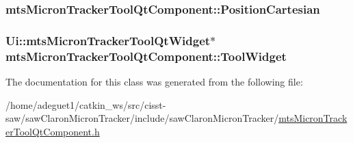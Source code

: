 \hypertarget{classmts_micron_tracker_tool_qt_component_a9ce46838a73866850a7a06a339b4d121}{
\subsubsection[{Position\-Cartesian}]{ mts\-Micron\-Tracker\-Tool\-Qt\-Component\-::\-Position\-Cartesian}}\label{classmts_micron_tracker_tool_qt_component_a9ce46838a73866850a7a06a339b4d121}
\hypertarget{classmts_micron_tracker_tool_qt_component_a78d45496b35b856b483e6600599dc4a4}{
\subsubsection[{Tool\-Widget}]{\setlength{\rightskip}{0pt plus 5cm}Ui\-::mts\-Micron\-Tracker\-Tool\-Qt\-Widget$\ast$ mts\-Micron\-Tracker\-Tool\-Qt\-Component\-::\-Tool\-Widget\hspace{0.3cm}{\ttfamily [protected]}}}\label{classmts_micron_tracker_tool_qt_component_a78d45496b35b856b483e6600599dc4a4}


The documentation for this class was generated from the following file\-:\begin{DoxyCompactItemize}
\item 
/home/adeguet1/catkin\-\_\-ws/src/cisst-\/saw/saw\-Claron\-Micron\-Tracker/include/saw\-Claron\-Micron\-Tracker/\hyperlink{mts_micron_tracker_tool_qt_component_8h}{mts\-Micron\-Tracker\-Tool\-Qt\-Component.\-h}\end{DoxyCompactItemize}
